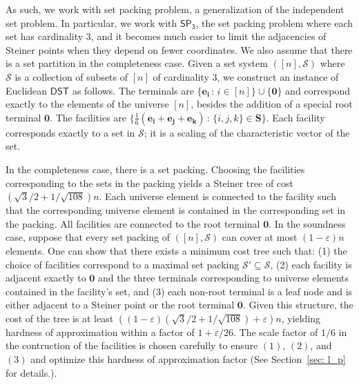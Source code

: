 \documentclass{article}\providecommand{\DeclareRedundantLanguages}[2]{}\usepackage[a4paper,margin=20mm]{geometry}
\newcommand{\1}{\textbf{1}}
\newcommand{\setpT}{$\mathsf{SP_3}$\xspace}
\newcommand{\dst}{$\mathsf{DST}$\xspace}
\begin{document}

As such, we work with set packing problem, a generalization of the independent set problem. In particular, we work with \setpT, the set packing problem where each set has cardinality $3$, and it becomes much easier to limit the adjacencies of Steiner points when they depend on fewer coordinates.  We also assume that there is a set partition in the completeness case. Given a set system $([n], \mathcal{S})$ where $\mathcal{S}$ is a collection of subsets of $[n]$ of cardinality $3$, we construct an instance of Euclidean \dst as follows. The terminals are $\{ \mathbf{e_i} \,:\, i \in [n]\} \cup \{\mathbf{0}\}$ and correspond exactly to the elements of the universe $[n]$, besides the addition of a special root terminal $\mathbf{0}$. The facilities are $\{\frac{1}{6}(\mathbf{e_i} + \mathbf{e_j} + \mathbf{e_k}) \,:\, \{i,j,k\} \in \mathbf{S}\}$. Each facility corresponds exactly to a set in $\mathcal{S}$; it is a scaling of the characteristic vector of the set.

In the completeness case, there is a set packing. Choosing the facilities corresponding to the sets in the packing yields a Steiner tree of cost $(\sqrt{3}/2 + 1/\sqrt{108})n$. Each universe element is connected to the facility such that the corresponding universe element is contained in the corresponding set in the packing. All facilities are connected to the root terminal $\mathbf{0}$. In the soundness case, suppose that every set packing of $([n], \mathcal{S})$ can cover at most $(1-\varepsilon)n$ elements. One can show that there exists a minimum cost tree such that: (1) the choice of facilities correspond to a maximal set packing $\mathcal{S}' \subseteq \mathcal{S}$, (2) each facility is adjacent exactly to $\mathbf{0}$ and the three terminals corresponding to universe elements contained in the facility's set, and (3) each non-root terminal is a leaf node and is either adjacent to a Steiner point or the root terminal $\mathbf{0}$. Given this structure, the cost of the tree is at least $((1 - \varepsilon)(\sqrt{3}/2 + 1/\sqrt{108}) + \varepsilon)n$, yielding hardness of approximation within a factor of  $1 + \varepsilon/26$. The scale factor of $1/6$ in the contruction of the facilities is chosen carefully to ensure $(1)$, $(2)$, and $(3)$ and optimize this hardness of approximation factor (See Section~\ref{sec: l_p} for details.). 
\end{document}
